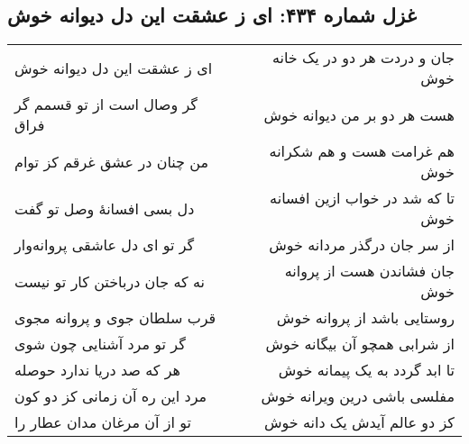 \begin{center}
\section*{غزل شماره ۴۳۴: ای ز عشقت این دل دیوانه خوش}
\label{sec:434}
\begin{longtable}{l p{0.5cm} r}
ای ز عشقت این دل دیوانه خوش
&&
جان و دردت هر دو در یک خانه خوش
\\
گر وصال است از تو قسمم گر فراق
&&
هست هر دو بر من دیوانه خوش
\\
من چنان در عشق غرقم کز توام
&&
هم غرامت هست و هم شکرانه خوش
\\
دل بسی افسانهٔ وصل تو گفت
&&
تا که شد در خواب ازین افسانه خوش
\\
گر تو ای دل عاشقی پروانه‌وار
&&
از سر جان درگذر مردانه خوش
\\
نه که جان درباختن کار تو نیست
&&
جان فشاندن هست از پروانه خوش
\\
قرب سلطان جوی و پروانه مجوی
&&
روستایی باشد از پروانه خوش
\\
گر تو مرد آشنایی چون شوی
&&
از شرابی همچو آن بیگانه خوش
\\
هر که صد دریا ندارد حوصله
&&
تا ابد گردد به یک پیمانه خوش
\\
مرد این ره آن زمانی کز دو کون
&&
مفلسی باشی درین ویرانه خوش
\\
تو از آن مرغان مدان عطار را
&&
کز دو عالم آیدش یک دانه خوش
\\
\end{longtable}
\end{center}
